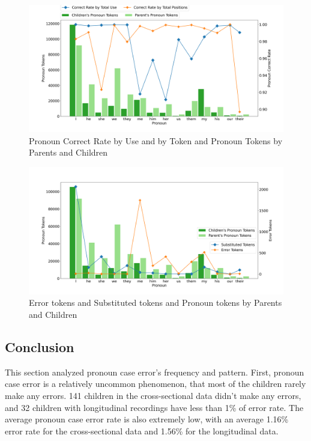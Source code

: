 \FloatBarrier
\begin{figure}[!h]
    \centering
    \includegraphics[scale = 0.35]{graph/PronounandRate.png}
    \vspace{-2em}
    \caption{Pronoun Correct Rate by Use and by Token and Pronoun Tokens by Parents and Children }
    \label{fig:corrct}
\end{figure}
\FloatBarrier
\FloatBarrier
\begin{figure}[!h]
    \centering
    \includegraphics[scale = 0.35]{graph/Pronounandtoken.png}
    \vspace{-2em}
    \caption{Error tokens and Substituted tokens and Pronoun tokens by Parents and Children}
    \label{fig:errortoken}
\end{figure}
\FloatBarrier


\subsection{Conclusion}
This section analyzed pronoun case error's frequency and pattern. First, pronoun case error is a relatively uncommon phenomenon, that most of the children rarely make any errors. 141 children in the cross-sectional data didn't make any errors, and 32 children with longitudinal recordings have less than 1\% of error rate. The average pronoun case error rate is also extremely low, with an average 1.16\% error rate for the cross-sectional data and 1.56\% for the longitudinal data. 

